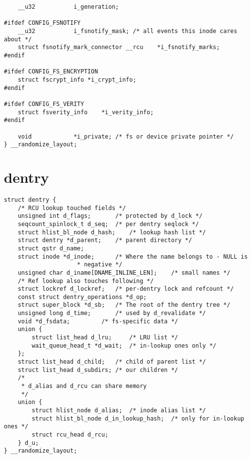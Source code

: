 \begin{lstlisting}
	__u32			i_generation;

#ifdef CONFIG_FSNOTIFY
	__u32			i_fsnotify_mask; /* all events this inode cares about */
	struct fsnotify_mark_connector __rcu	*i_fsnotify_marks;
#endif

#ifdef CONFIG_FS_ENCRYPTION
	struct fscrypt_info	*i_crypt_info;
#endif

#ifdef CONFIG_FS_VERITY
	struct fsverity_info	*i_verity_info;
#endif

	void			*i_private; /* fs or device private pointer */
} __randomize_layout;
\end{lstlisting}

\section{dentry}

\begin{lstlisting}
struct dentry {
	/* RCU lookup touched fields */
	unsigned int d_flags;		/* protected by d_lock */
	seqcount_spinlock_t d_seq;	/* per dentry seqlock */
	struct hlist_bl_node d_hash;	/* lookup hash list */
	struct dentry *d_parent;	/* parent directory */
	struct qstr d_name;
	struct inode *d_inode;		/* Where the name belongs to - NULL is
					 * negative */
	unsigned char d_iname[DNAME_INLINE_LEN];	/* small names */
	/* Ref lookup also touches following */
	struct lockref d_lockref;	/* per-dentry lock and refcount */
	const struct dentry_operations *d_op;
	struct super_block *d_sb;	/* The root of the dentry tree */
	unsigned long d_time;		/* used by d_revalidate */
	void *d_fsdata;			/* fs-specific data */
	union {
		struct list_head d_lru;		/* LRU list */
		wait_queue_head_t *d_wait;	/* in-lookup ones only */
	};
	struct list_head d_child;	/* child of parent list */
	struct list_head d_subdirs;	/* our children */
	/*
	 * d_alias and d_rcu can share memory
	 */
	union {
		struct hlist_node d_alias;	/* inode alias list */
		struct hlist_bl_node d_in_lookup_hash;	/* only for in-lookup ones */
	 	struct rcu_head d_rcu;
	} d_u;
} __randomize_layout;
\end{lstlisting}

